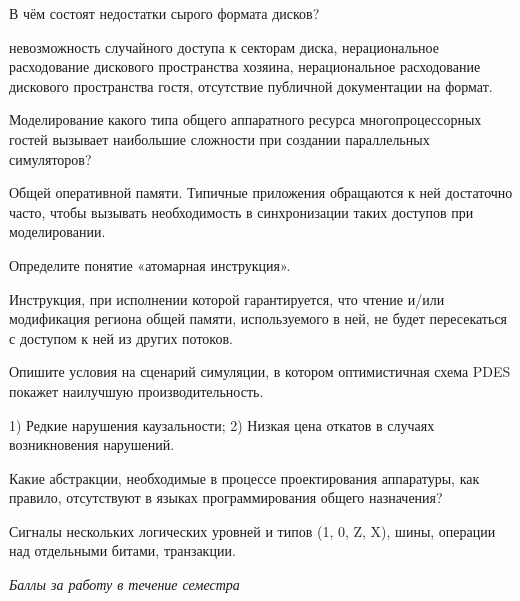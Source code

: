\documentclass[a4paper, 12pt, addpoints, answers]{exam}
\begin{document}
\begin{questions}
\question[1] В чём состоят недостатки сырого формата дисков?
\begin{choices}
\choice невозможность случайного доступа к секторам диска,
\correctchoice нерациональное расходование дискового пространства хозяина,
\choice нерациональное расходование дискового пространства гостя,
\choice отсутствие публичной документации на формат.
\end{choices}




\question[3] Моделирование какого типа общего аппаратного ресурса многопроцессорных гостей вызывает наибольшие сложности при создании параллельных симуляторов?
\begin{solution}[2cm]
 Общей оперативной памяти. Типичные приложения обращаются к ней достаточно часто, чтобы вызывать необходимость в синхронизации таких доступов при моделировании.
\end{solution}

\question[3] Определите понятие «атомарная инструкция».
\begin{solution}[2cm]
Инструкция, при исполнении которой гарантируется, что чтение и/или модификация региона общей памяти, используемого в ней, не будет пересекаться с доступом к ней из других потоков.
\end{solution}

\question[3] Опишите условия на сценарий симуляции, в котором оптимистичная схема PDES покажет наилучшую производительность.
\begin{solution}[2cm]
1) Редкие нарушения каузальности; 2) Низкая цена откатов в случаях возникновения нарушений.
\end{solution}

\question[3] Какие абстракции, необходимые в процессе проектирования аппаратуры, как правило, отсутствуют в языках программирования общего назначения?
\begin{solution}[2cm]
Сигналы нескольких логических уровней и типов (1, 0, Z, X), шины, операции над отдельными битами, транзакции.
\end{solution}




\bonusquestion \textit{Баллы за работу в течение семестра}

\newpage
\phantom{Blank page}

\end{questions}
\end{document}
